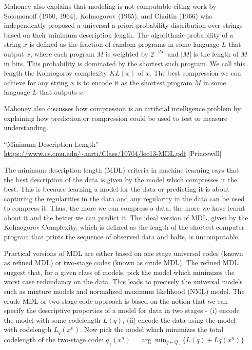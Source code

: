 \documentclass[12pt]{article}
\begin{document}
Mahoney also explains that modeling is not computable citing work by Solomonoff (1960, 1964), Kolmogorov (1965), and Chaitin (1966) who independently proposed a universal a-priori probability distribution over strings based on their minimum description length. The algorithmic probability of a string $x$ is defined as the fraction of random programs in some language $L$ that output $x$, where each program $M$ is weighted by $2^{-|M|}$ and $|M|$ is the length of $M$ in bits. This probability is dominated by the shortest such program. We call this length the Kolmogorov complexity $KL(x)$ of $x$.
The best compression we can achieve for any string $x$ is to encode it as the shortest program $M$ in some language $L$ that outputs $x$.

Mahoney also discusses how compression is an artificial intelligence problem by explaining how prediction or compression could be used to test or measure understanding.

``Minimum Description Length” \url{https://www.cs.cmu.edu/~aarti/Class/10704/lec13-MDL.pdf} [Princewill]

The minimum description length (MDL) criteria in machine learning says that the best description of the data is given by the model which compresses it the best. This is because learning a model for the data or predicting it is about capturing the regularities in the data and any regularity in the data can be used to compress it. Thus, the more we can compress a data, the more we have learnt about it and the better we can predict it. The ideal version of MDL, given by the Kolmogorov Complexity, which is deﬁned as the length of the shortest computer program that prints the sequence of observed data and halts, is uncomputable.

Practical versions of MDL are either based on one stage universal codes (known as reﬁned MDL) or two-stage codes (known as crude MDL). The reﬁned MDL suggest that, for a given class of models, pick the model which minimizes the worst case redundancy on the data. This leads to precisely the universal models such as mixture models and normalized maximum likelihood (NML) model. The crude MDL or two-stage code approach is based on the notion that we can specify the descriptive properties of a model for data in two stages - (i) encode the model with some codelength $L(q)$, (ii) encode the data using the model with codelength $L_q(x^n)$. Now pick the model which minimizes the total codelength of the two-stage code: $q_\gamma(x^n) = \arg \min_{q\in Q_\gamma} \{L(q) + Lq(x^n)\}$
\end{document}
